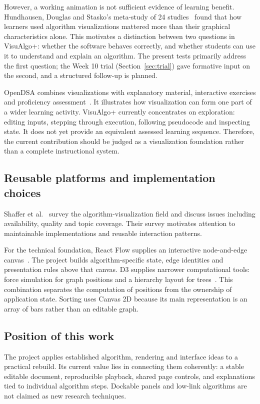 \documentclass[11pt,a4paper]{article}
\begin{document}
However, a working animation is not sufficient evidence of learning benefit. Hundhausen, Douglas and Stasko's meta-study of 24 studies~\cite{hundhausen2002} found that how learners used algorithm visualizations mattered more than their graphical characteristics alone. This motivates a distinction between two questions in VisuAlgo+: whether the software behaves correctly, and whether students can use it to understand and explain an algorithm. The present tests primarily address the first question; the Week 10 trial (Section~\ref{sec:trial}) gave formative input on the second, and a structured follow-up is planned.

OpenDSA combines visualizations with explanatory material, interactive exercises and proficiency assessment~\cite{opendsa}. It illustrates how visualization can form one part of a wider learning activity. VisuAlgo+ currently concentrates on exploration: editing inputs, stepping through execution, following pseudocode and inspecting state. It does not yet provide an equivalent assessed learning sequence. Therefore, the current contribution should be judged as a visualization foundation rather than a complete instructional system.

\subsection{Reusable platforms and implementation choices}
Shaffer et al.~\cite{shaffer2010} survey the algorithm-visualization field and discuss issues including availability, quality and topic coverage. Their survey motivates attention to maintainable implementations and reusable interaction patterns.

For the technical foundation, React Flow supplies an interactive node-and-edge canvas~\cite{reactflow}. The project builds algorithm-specific state, edge identities and presentation rules above that canvas. D3 supplies narrower computational tools: force simulation for graph positions and a hierarchy layout for trees~\cite{d3}. This combination separates the computation of positions from the ownership of application state. Sorting uses Canvas 2D because its main representation is an array of bars rather than an editable graph.

\subsection{Position of this work}
The project applies established algorithm, rendering and interface ideas to a practical rebuild. Its current value lies in connecting them coherently: a stable editable document, reproducible playback, shared page controls, and explanations tied to individual algorithm steps. Dockable panels and low-link algorithms are not claimed as new research techniques.
\end{document}
